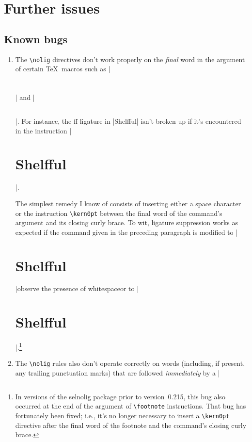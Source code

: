 \documentclass[11pt]{article}
\newcommand{\pkg}[1]{\textsf{#1}}
\newcommand{\cmmd}[1]{\texttt{\textbackslash #1}}
\begin{document}
\section{Further issues}

\subsection{Known bugs}

\begin{enumerate}
\item The \cmmd{nolig} directives don't work properly on the \emph{final} word in the argument of certain \TeX\ macros such as |\section{}| and |\subsection{}|. For instance, the ff ligature in |Shelfful| isn't broken up if it's encountered in the instruction |\section{Shelfful}|.

The simplest remedy I know of consists of inserting either a space character or the instruction \cmmd{kern0pt} between the final word of the command's argument and its closing curly brace. To wit, ligature suppression works as expected if the command given in the preceding paragraph is modified to |\section{Shelfful }|\textemdash observe the presence of whitespace\textemdash or to |\section{Shelfful\kern0pt}|.\footnote{In versions of the \pkg{selnolig} package prior to version~0.215, this bug also occurred at the end of the argument of \cmmd{footnote} instructions. That bug has fortunately been fixed; i.e., it's no longer necessary to insert a \cmmd{kern0pt} directive after the final word of the footnote and the command's closing curly brace.}

\item The \cmmd{nolig} rules also don't operate correctly on words (including, if present, any trailing punctuation marks) that are followed \emph{immediately} by a |%


\end{enumerate}
\end{document}
